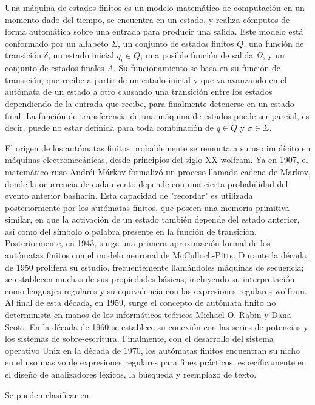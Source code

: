 \documentclass[journal,trans]{IEEEtran}
\begin{document}
	Una máquina de estados finitos es un modelo matemático de computación en un momento dado del tiempo, se encuentra en un estado, y realiza cómputos de forma automática sobre una entrada para producir una salida. Este modelo está conformado por un alfabeto $\Sigma$, un conjunto de estados finitos $Q$, una función de transición $\delta$, un estado inicial $q_{i} \in Q$, una posible función de salida $\Omega$, y un conjunto de estados finales $A$. 
	Su funcionamiento se basa en su función de transición, que recibe a partir de un estado inicial y que va avanzando en el autómata de un estado a otro causando una transición entre los estados dependiendo de la entrada que recibe, para finalmente detenerse en un estado final.
	La función de transferencia de una máquina de estados puede ser parcial, es decir, puede no estar definida para toda combinación de $q \in Q$  y $\sigma \in \Sigma$.
	
	El origen de los autómatas finitos probablemente se remonta a su uso implícito en máquinas electromecánicas, desde principios del siglo XX {wolfram}.  Ya en 1907, el matemático ruso Andréi Márkov formalizó un proceso llamado cadena de Markov, donde la ocurrencia de cada evento depende con una cierta probabilidad del evento anterior {basharin}. Esta capacidad de "recordar" es utilizada posteriormente por los autómatas finitos, que poseen una memoria primitiva similar, en que la activación de un estado también depende del estado anterior, así como del símbolo o palabra presente en la función de transición.
	Posteriormente, en 1943, surge una primera aproximación formal de los autómatas finitos con el modelo neuronal de McCulloch-Pitts. Durante la década de 1950 prolifera su estudio, frecuentemente llamándoles máquinas de secuencia; se establecen muchas de sus propiedades básicas, incluyendo su interpretación como lenguajes regulares y su equivalencia con las expresiones regulares {wolfram}. Al final de esta década, en 1959, surge el concepto de autómata finito no determinista en manos de los informáticos teóricos Michael O. Rabin y Dana Scott.
	En la década de 1960 se establece su conexión con las series de potencias y los sistemas de sobre-escritura. Finalmente, con el desarrollo del sistema operativo Unix en la década de 1970, los autómatas finitos encuentran su nicho en el uso masivo de expresiones regulares para fines prácticos, específicamente en el diseño de analizadores léxicos, la búsqueda y reemplazo de texto.	
	
	Se pueden clasificar en:
	
\end{document}
